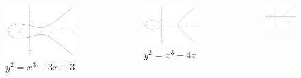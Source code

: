 \documentclass[xcolor=pdftex,dvipsnames,table]{beamer}
\theoremstyle{plain}
\theoremstyle{definition}
\begin{document}
\begin{frame}
\begin{columns}
\begin{figure}
		\includegraphics[scale=0.1]{c3.png}
		\caption{$y^2=x^3-3x+3$}
	\end{figure}
	\begin{figure}
		\centering
		\includegraphics[scale=0.1]{c4.png}
		\caption{$y^2=x^3-4x$}
	\end{figure}
	\begin{figure}
		\centering
		\includegraphics[scale=0.1]{c5.png}

\end{figure}
\end{columns}
\end{frame}
\end{document}
